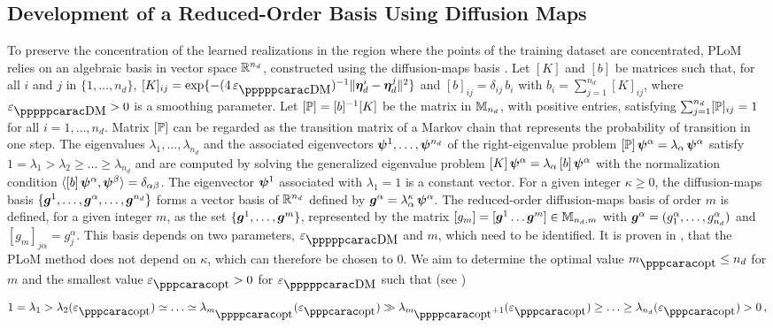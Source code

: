 \subsection{Development of a Reduced-Order Basis Using Diffusion Maps}
\label{sec:PLoM.3}
%
To preserve the concentration of the learned realizations in the region where the points of the training dataset are concentrated, PLoM relies on  an algebraic basis in  vector space ${\mathbb{R}}^{n_d}$, constructed using the diffusion-maps basis \cite{Coifman2005}.
Let $[K]$  and  $[b]$ be matrices such that, for all $i$ and $j$ in $\{1,\ldots , n_d\}$, $[K]_{ij} = \exp\{-(4\,\varepsilon_\DM)^{-1} \Vert\bfeta_d^i-\bfeta_d^j\Vert^2\}$ and $[b]_{ij} = \delta_{ij} \, b_i$ with $b_i = \sum_{j=1}^{n_d} [K]_{ij}$, where $\varepsilon_\DM >0$ is a smoothing parameter.
%
Let $[{\mathbb{P}}] = [b]^{-1} [K]$ be  the matrix in ${\mathbb{M}}_{n_d}$, with positive entries, satisfying $\sum_{j=1}^{n_d} [{\mathbb{P}}]_{ij} = 1$ for all $i=1,\ldots , n_d$. Matrix $[{\mathbb{P}}]$ can be regarded as the transition matrix of a Markov chain that represents the probability of transition in one step. The eigenvalues $\lambda_1,\ldots,\lambda_{n_d}$ and the associated eigenvectors ${\boldsymbol{\psi}}^1,\ldots,{\boldsymbol{\psi}}^{n_d}$ of the right-eigenvalue problem $[{\mathbb{P}}]\, {\boldsymbol{\psi}}^\alpha = \lambda_\alpha\, {\boldsymbol{\psi}}^\alpha$ satisfy $ 1=\lambda_1 > \lambda_2 \geq \ldots \geq \lambda_{n_d}$ and are computed by solving the generalized eigenvalue problem $[K]\, {\boldsymbol{\psi}}^\alpha = \lambda_\alpha\, [b]\,{\boldsymbol{\psi}}^\alpha$ with the normalization condition $\langle [b]\,{\boldsymbol{\psi}}^\alpha,{\boldsymbol{\psi}}^\beta \rangle =\delta_{\alpha\beta}$. The eigenvector ${\boldsymbol{\psi}}^1$ associated with $\lambda_1=1$ is a constant vector.
%
For a given integer $\kappa \geq 0$,  the diffusion-maps basis $\{{\boldsymbol{g}}^1,\ldots,{\boldsymbol{g}}^\alpha,\ldots, {\boldsymbol{g}}^{n_d}\}$ forms a vector basis of ${\mathbb{R}}^{n_d}$ defined by ${\boldsymbol{g}}^\alpha = \lambda^\kappa_\alpha\,{\boldsymbol{\psi}}^\alpha$. The reduced-order diffusion-maps basis of order $m$ is defined,
for a given integer $m$, as the set $\{{\boldsymbol{g}}^1,\ldots,{\boldsymbol{g}}^m\}$, represented by the matrix $[g_m] = [{\boldsymbol{g}}^1 \ldots {\boldsymbol{g}}^m]\in{\mathbb{M}}_{n_d,m}$ with ${\boldsymbol{g}}^\alpha = (g_1^\alpha,\ldots ,g_{n_d}^\alpha)$ and $[g_m]_{j\alpha} = g_j^\alpha$. This basis depends on two parameters, $\varepsilon_\DM$ and $m$, which need to be identified. It is proven in \cite{Soize2020c}, that the PLoM method does not depend on $\kappa$, which can therefore be chosen to $0$.
%
We aim to determine the optimal value $m_\opt \leq n_d$ for $m$ and the smallest value $\varepsilon_\opt > 0 $ for $\varepsilon_\DM$ such that (see \cite{Soize2022a})
%
\begin{equation} \label{eqPLoM4}
1=\lambda_1 > \lambda_2(\varepsilon_\opt) \simeq \ldots \simeq \lambda_{m_\popt}(\varepsilon_\opt)
 \gg \lambda_{m_\popt+1}(\varepsilon_\opt)\geq \ldots \geq \lambda_{n_d}(\varepsilon_\opt) > 0\, ,
\end{equation}
